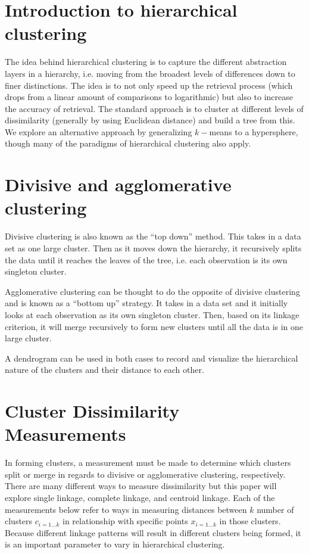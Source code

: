 \documentclass[../tech_report_1.tex]{subfiles}
\begin{document}
\section{Introduction to hierarchical clustering}

The idea behind hierarchical clustering is to capture the different abstraction layers in a hierarchy, i.e. moving from the broadest levels of differences down to finer distinctions. The idea is to not only speed up the retrieval process (which drops from a linear amount of comparisons to logarithmic) but also to increase the accuracy of retrieval. The standard approach is to cluster at different levels of dissimilarity (generally by using Euclidean distance) and build a tree from this. We explore an alternative approach by generalizing $k-$means to a hypersphere, though many of the paradigms of hierarchical clustering also apply.

\section{Divisive and agglomerative clustering}


Divisive clustering\cite{schutze2008introduction} is also known as the ``top down'' method. This takes
in a data set as one large cluster. Then as it moves down the hierarchy,
it recursively splits the data until it reaches the leaves of the tree, i.e. each
observation is its own singleton cluster.

Agglomerative clustering can be thought to do the opposite of divisive
clustering and is known as a ``bottom up'' strategy. It takes in
a data set and it initially looks at each observation as its own singleton
cluster. Then, based on its linkage criterion, it will merge recursively
to form new clusters until all the data is in one large cluster.

A dendrogram\cite{langfelder2008defining} can be used in both cases to record and visualize the hierarchical nature of the
clusters and their distance to each other.

\section{Cluster Dissimilarity Measurements}


In forming clusters, a measurement must be made to determine which
clusters split or merge in regards to divisive or agglomerative clustering,
respectively. There are many different ways to measure dissimilarity
but this paper will explore single linkage, complete linkage, and
centroid linkage. Each of the measurements below refer to ways in
measuring distances between $k$ number of clusters $c_{i=1\dots k}$
in relationship with specific points $x_{i=1\dots k}$ in those clusters. Because different linkage patterns will result in different clusters being formed, it is an important parameter to vary in hierarchical clustering.
\end{document}
